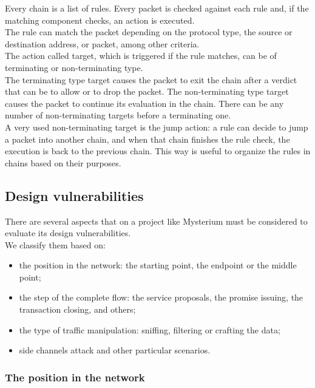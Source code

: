 \documentclass[]{article}
\begin{document}
	Every chain is a list of rules. Every packet is checked against each rule and, if the matching component checks, an action is executed.\\
	The rule can match the packet depending on the protocol type, the source or destination address, or packet, among other criteria.\\
	The action called target, which is triggered if the rule matches, can be of terminating or non-terminating type.\\
	The terminating type target causes the packet to exit the chain after a verdict that can be to allow or to drop the packet.
	The non-terminating type target causes the packet to continue its evaluation in the chain. There can be any number of non-terminating targets before a terminating one.\\
	A very used non-terminating target is the jump action: a rule can decide to jump a packet into another chain, and when that chain finishes the rule check, the execution is back to the previous chain. This way is useful to organize the rules in chains based on their purposes.\\

	\subsection{Design vulnerabilities}

	There are several aspects that on a project like Mysterium must be considered to evaluate its design vulnerabilities.\\
	We classify them based on:
	\begin{itemize}
		\item the position in the network: the starting point, the endpoint or the middle point;
		\item the step of the complete flow: the service proposals, the promise issuing, the transaction closing, and others;
		\item the type of traffic manipulation: sniffing, filtering or crafting the data;
		\item side channels attack and other particular scenarios.
	\end{itemize}
	
	\subsubsection{The position in the network}
\end{document}
